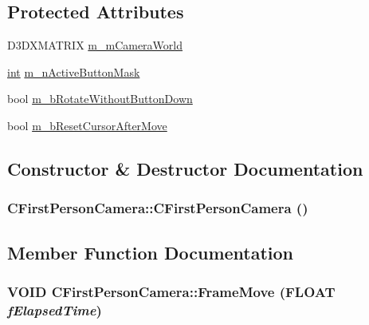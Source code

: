 \subsection*{Protected Attributes}
\begin{DoxyCompactItemize}
\item 
D3DXMATRIX \hyperlink{class_c_first_person_camera_a4065145f014e4ea76ad27537418fd34e}{m\_\-mCameraWorld}
\item 
\hyperlink{_d_x_u_tgui_8cpp_a2d77ed03302b6978834ee3b6f57837fb}{int} \hyperlink{class_c_first_person_camera_a443dce2d48aa73eaecffd696eed9bd94}{m\_\-nActiveButtonMask}
\item 
bool \hyperlink{class_c_first_person_camera_a5fbd2d7347724f3d22c2ff78d9547c52}{m\_\-bRotateWithoutButtonDown}
\item 
bool \hyperlink{class_c_first_person_camera_a94d8d853ab5a68c7138dd6e47ad8b47f}{m\_\-bResetCursorAfterMove}
\end{DoxyCompactItemize}


\subsection{Constructor \& Destructor Documentation}
\hypertarget{class_c_first_person_camera_a0c277136d6a3593f8206428eb37e0500}{
\subsubsection[{CFirstPersonCamera}]{\setlength{\rightskip}{0pt plus 5cm}CFirstPersonCamera::CFirstPersonCamera ()}}
\label{class_c_first_person_camera_a0c277136d6a3593f8206428eb37e0500}


\subsection{Member Function Documentation}
\hypertarget{class_c_first_person_camera_a86e482e92a7a17db600e82ad9a29ca01}{
\subsubsection[{FrameMove}]{\setlength{\rightskip}{0pt plus 5cm}VOID CFirstPersonCamera::FrameMove (FLOAT {\em fElapsedTime})}}
\label{class_c_first_person_camera_a86e482e92a7a17db600e82ad9a29ca01}


